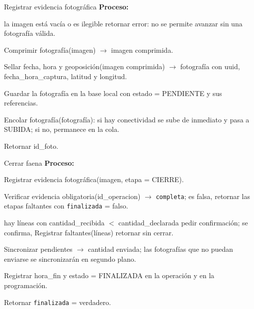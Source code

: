 \begin{modspec}{Registrar evidencia fotográfica}
\textbf{Proceso:}
\begin{logica}
    \item {} la imagen está vacía o es ilegible  retornar error: no se
    permite avanzar sin una fotografía válida.
    \item Comprimir fotografía(imagen) $\rightarrow$ imagen comprimida.
    \item Sellar fecha, hora y geoposición(imagen comprimida) $\rightarrow$ fotografía con
    uuid, fecha\_hora\_captura, latitud y longitud.
    \item Guardar la fotografía en la base local con estado = PENDIENTE y sus referencias.
    \item Encolar fotografía(fotografía): si hay conectividad se sube de inmediato y pasa a
    SUBIDA; si no, permanece en la cola.
    \item Retornar id\_foto.
\end{logica}
\end{modspec}

\begin{modspec}{Cerrar faena}
\textbf{Proceso:}
\begin{logica}
    \item Registrar evidencia fotográfica(imagen, etapa = CIERRE).
    \item Verificar evidencia obligatoria(id\_operacion) $\rightarrow$ \texttt{completa};
     es falsa, retornar las etapas faltantes con \texttt{finalizada} = falso.
    \item {} hay líneas con cantidad\_recibida $<$ cantidad\_declarada 
    pedir confirmación;  se confirma, Registrar faltantes(líneas)  retornar
    sin cerrar.
    \item Sincronizar pendientes $\rightarrow$ cantidad enviada; las fotografías que no
    puedan enviarse se sincronizarán en segundo plano.
    \item Registrar hora\_fin y estado = FINALIZADA en la operación y en la programación.
    \item Retornar \texttt{finalizada} = verdadero.
\end{logica}
\end{modspec}

